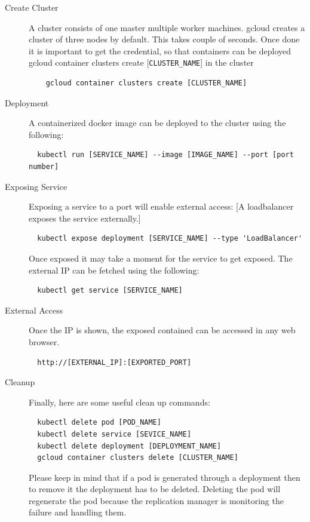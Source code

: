 \begin{description}
\item[Create Cluster] A cluster consists of one master multiple worker 
machines.  gcloud creates a cluster of three nodes by default. This takes
 couple of  seconds. Once done it is important to get the credential, so that
  containers can be deployed gcloud container clusters create
  [\verb|CLUSTER_NAME|] in
   the cluster
  \begin{verbatim}
    gcloud container clusters create [CLUSTER_NAME]
  \end{verbatim}
\item[Deployment] A containerized docker image can be deployed to the cluster 
using the following:
\begin{verbatim}
  kubectl run [SERVICE_NAME] --image [IMAGE_NAME] --port [port number]
\end{verbatim}
\item [Exposing Service] Exposing a service to a port will enable external 
access:
[A loadbalancer exposes the service externally.]
\begin{verbatim}
  kubectl expose deployment [SERVICE_NAME] --type 'LoadBalancer'
\end{verbatim}

Once exposed it may take a moment for the service to get exposed. The external
 IP can be fetched using the following:
\begin{verbatim}
  kubectl get service [SERVICE_NAME]
\end{verbatim}

\item [External Access] Once the IP is shown, the exposed contained can be 
accessed in any web browser.
\begin{verbatim}
  http://[EXTERNAL_IP]:[EXPORTED_PORT]
\end{verbatim}

\item [Cleanup] Finally, here are some useful clean up commands:
\begin{verbatim}
  kubectl delete pod [POD_NAME]
  kubectl delete service [SEVICE_NAME]
  kubectl delete deployment [DEPLOYMENT_NAME]
  gcloud container clusters delete [CLUSTER_NAME]
\end{verbatim}

Please keep in mind that if a pod is generated through a deployment then to 
remove it the deployment has to be deleted. Deleting the pod will regenerate 
the pod because the replication manager is monitoring the failure and handling 
them. 
\end{description}

